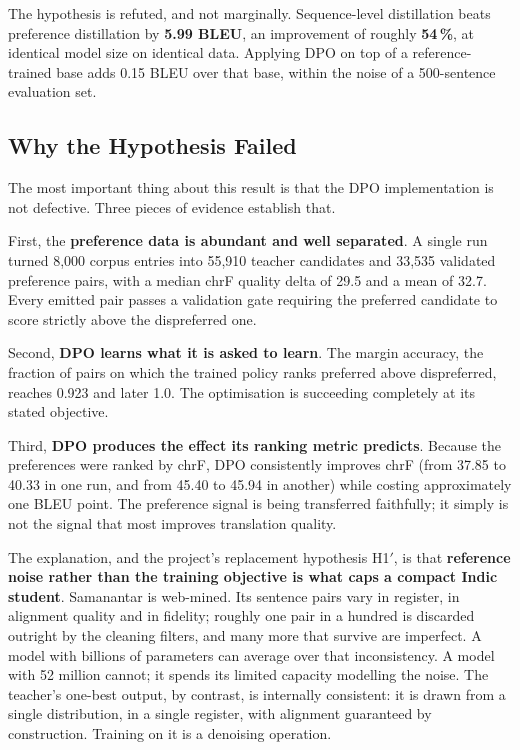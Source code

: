The hypothesis is refuted, and not marginally. Sequence-level distillation beats
preference distillation by \textbf{5.99 BLEU}, an improvement of roughly
\textbf{54\,\%}, at identical model size on identical data. Applying DPO on top
of a reference-trained base adds 0.15 BLEU over that base, within the noise of
a 500-sentence evaluation set.

\subsection{Why the Hypothesis Failed}
\label{subsec:whyfailed}

The most important thing about this result is that the DPO implementation is not
defective. Three pieces of evidence establish that.

First, the \textbf{preference data is abundant and well separated}. A single run
turned 8{,}000 corpus entries into 55{,}910 teacher candidates and 33{,}535
validated preference pairs, with a median chrF quality delta of 29.5 and a mean
of 32.7. Every emitted pair passes a validation gate requiring the preferred
candidate to score strictly above the dispreferred one.

Second, \textbf{DPO learns what it is asked to learn}. The margin accuracy,
the fraction of pairs on which the trained policy ranks preferred above
dispreferred, reaches 0.923 and later 1.0. The optimisation is succeeding
completely at its stated objective.

Third, \textbf{DPO produces the effect its ranking metric predicts}. Because the
preferences were ranked by chrF, DPO consistently improves chrF (from 37.85
to 40.33 in one run, and from 45.40 to 45.94 in another) while costing
approximately one BLEU point. The preference signal is being transferred
faithfully; it simply is not the signal that most improves translation quality.

The explanation, and the project's replacement hypothesis H1$'$, is that
\textbf{reference noise rather than the training objective is what caps a
compact Indic student}. Samanantar is web-mined. Its sentence pairs vary in
register, in alignment quality and in fidelity; roughly one pair in a hundred is
discarded outright by the cleaning filters, and many more that survive are
imperfect. A model with billions of parameters can average over that
inconsistency. A model with 52 million cannot; it spends its limited capacity
modelling the noise. The teacher's one-best output, by contrast, is internally
consistent: it is drawn from a single distribution, in a single register, with
alignment guaranteed by construction. Training on it is a denoising operation.

